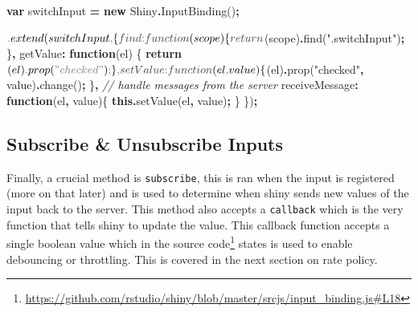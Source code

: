 \documentclass[
]{krantz}
\makeatletter
\newenvironment{Shaded}{\begin{snugshade}}{\end{snugshade}}
\newcommand{\CommentTok}[1]{\textcolor[rgb]{0.37,0.37,0.37}{\textit{#1}}}
\newcommand{\ControlFlowTok}[1]{\textcolor[rgb]{0.27,0.27,0.27}{\textbf{#1}}}
\newcommand{\DataTypeTok}[1]{\textcolor[rgb]{0.27,0.27,0.27}{#1}}
\newcommand{\FunctionTok}[1]{\textcolor[rgb]{0,0,0}{#1}}
\newcommand{\KeywordTok}[1]{\textcolor[rgb]{0.27,0.27,0.27}{\textbf{#1}}}
\newcommand{\NormalTok}[1]{#1}
\newcommand{\OperatorTok}[1]{\textcolor[rgb]{0.43,0.43,0.43}{\textbf{#1}}}
\newcommand{\StringTok}[1]{\textcolor[rgb]{0.5,0.5,0.5}{#1}}
\renewcommand{\href}[2]{#2\footnote{\url{#1}}}
\newenvironment{kframe}{%
\medskip{}
\setlength{\fboxsep}{.8em}
 \def\at@end@of@kframe{}%
 \ifinner\ifhmode%
  \def\at@end@of@kframe{\end{minipage}}%
  \begin{minipage}{\columnwidth}%
 \fi\fi%
 \def\FrameCommand##1{\hskip\@totalleftmargin \hskip-\fboxsep
 \colorbox{shadecolor}{##1}\hskip-\fboxsep
     \hskip-\linewidth \hskip-\@totalleftmargin \hskip\columnwidth}%
 \MakeFramed {\advance\hsize-\width
   \@totalleftmargin\z@ \linewidth\hsize
   \@setminipage}}%
 {\par\unskip\endMakeFramed%
 \at@end@of@kframe}
\renewenvironment{Shaded}{\begin{kframe}}{\end{kframe}}
\makeatother
\begin{document}
\begin{Shaded}
\begin{Highlighting}[]
\KeywordTok{var}\NormalTok{ switchInput }\OperatorTok{=} \KeywordTok{new}\NormalTok{ Shiny}\OperatorTok{.}\FunctionTok{InputBinding}\NormalTok{()}\OperatorTok{;}

\NormalTok{$}\OperatorTok{.}\FunctionTok{extend}\NormalTok{(switchInput}\OperatorTok{,}\NormalTok{ \{}
  \DataTypeTok{find}\OperatorTok{:} \KeywordTok{function}\NormalTok{(scope) \{}
    \ControlFlowTok{return}\NormalTok{ $(scope)}\OperatorTok{.}\FunctionTok{find}\NormalTok{(}\StringTok{".switchInput"}\NormalTok{)}\OperatorTok{;}
\NormalTok{  \}}\OperatorTok{,}
  \DataTypeTok{getValue}\OperatorTok{:} \KeywordTok{function}\NormalTok{(el) \{}
    \ControlFlowTok{return}\NormalTok{ $(el)}\OperatorTok{.}\FunctionTok{prop}\NormalTok{(}\StringTok{"checked"}\NormalTok{)}\OperatorTok{;}
\NormalTok{  \}}\OperatorTok{,}
  \DataTypeTok{setValue}\OperatorTok{:} \KeywordTok{function}\NormalTok{(el}\OperatorTok{,}\NormalTok{ value) \{}
\NormalTok{    $(el)}\OperatorTok{.}\FunctionTok{prop}\NormalTok{(}\StringTok{"checked"}\OperatorTok{,}\NormalTok{ value)}\OperatorTok{.}\FunctionTok{change}\NormalTok{()}\OperatorTok{;}
\NormalTok{  \}}\OperatorTok{,}
  \CommentTok{// handle messages from the server}
  \DataTypeTok{receiveMessage}\OperatorTok{:} \KeywordTok{function}\NormalTok{(el}\OperatorTok{,}\NormalTok{ value)\{}
    \KeywordTok{this}\OperatorTok{.}\FunctionTok{setValue}\NormalTok{(el}\OperatorTok{,}\NormalTok{ value)}\OperatorTok{;}
\NormalTok{  \}}
\NormalTok{\})}\OperatorTok{;}
\end{Highlighting}
\end{Shaded}

\hypertarget{shiny-input-sub-unsub}{%
\subsection{Subscribe \& Unsubscribe Inputs}\label{shiny-input-sub-unsub}}

Finally, a crucial method is \texttt{subscribe}, this is ran when the input is registered (more on that later) and is used to determine when shiny sends new values of the input back to the server. This method also accepts a \texttt{callback} which is the very function that tells shiny to update the value. This callback function accepts a single boolean value which in the \href{https://github.com/rstudio/shiny/blob/master/srcjs/input_binding.js\#L18}{source code} states is used to enable debouncing or throttling. This is covered in the next section on rate policy.
\end{document}
